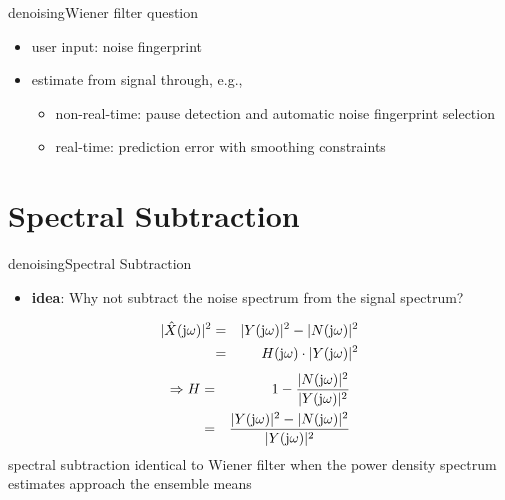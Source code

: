 	\begin{frame}{denoising}{Wiener filter question}
        
        \begin{itemize}
            \item   user input: noise fingerprint
            \item   estimate from signal through, e.g., 
                \begin{itemize}
                    \item non-real-time: pause detection and automatic noise fingerprint selection
                    \item real-time: prediction error with smoothing constraints
                \end{itemize}
        \end{itemize}
	\end{frame}

\section{Spectral Subtraction}
	\begin{frame}{denoising}{Spectral Subtraction}
        \begin{itemize}
            \item[] \textbf{idea}: Why not subtract the noise spectrum from the signal spectrum?
        \end{itemize}
        \begin{eqnarray*}
            |\hat{X}(\mathrm{j}\omega)|^2 &=& |Y(\mathrm{j}\omega)|^2 - |N(\mathrm{j}\omega)|^2\\
            &=& H(\mathrm{j}\omega)\cdot |Y(\mathrm{j}\omega)|^2\\
        \end{eqnarray*}
            \bigskip
            \pause
        \begin{eqnarray*}
            \Rightarrow H &=& 1-\frac{|N(\mathrm{j}\omega)|^2}{|Y(\mathrm{j}\omega)|^2}\\
            &=& \frac{|Y(\mathrm{j}\omega)|^2-|N(\mathrm{j}\omega)|^2}{|Y(\mathrm{j}\omega)|^2}
        \end{eqnarray*}
        \pause
        spectral subtraction identical to  Wiener filter when the power density spectrum estimates approach the ensemble means
	\end{frame}
	



